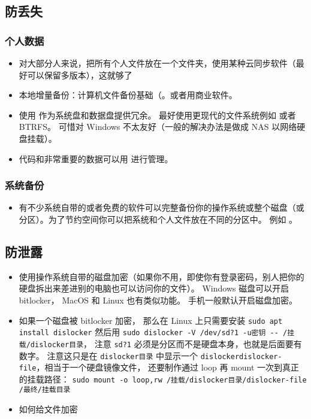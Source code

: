 
\begin{issues}
\issueDraft
\end{issues}

\subsection{防丢失}
\subsubsection{个人数据}
\begin{itemize}
\item 对大部分人来说，把所有个人文件放在一个文件夹，使用某种云同步软件（最好可以保留多版本），这就够了
\item 本地增量备份：计算机文件备份基础（。或者用商业软件。
\item 使用  作为系统盘和数据盘提供冗余。 最好使用更现代的文件系统例如  或者 BTRFS。 可惜对 Windows 不太友好（一般的解决办法是做成 NAS 以网络硬盘挂载）。
\item 代码和非常重要的数据可以用   进行管理。
\end{itemize}

\subsubsection{系统备份}
\begin{itemize}
\item 有不少系统自带的或者免费的软件可以完整备份你的操作系统或整个磁盘（或分区）。为了节约空间你可以把系统和个人文件放在不同的分区中。 例如 。
\end{itemize}

\subsection{防泄露}
\begin{itemize}
\item 使用操作系统自带的磁盘加密（如果你不用，即使你有登录密码，别人把你的硬盘拆出来差进别的电脑也可以访问你的文件）。 Windows 磁盘可以开启 bitlocker， MacOS 和 Linux 也有类似功能。 手机一般默认开启磁盘加密。
\item 如果一个磁盘被 bitlocker 加密， 那么在 Linux 上只需要安装 \verb`sudo apt install dislocker` 然后用 \verb`sudo dislocker -V /dev/sd?1 -u密钥 -- /挂载/dislocker目录`， 注意 \verb`sd?1` 必须是分区而不是硬盘本身，也就是后面要有数字。  注意这只是在 \verb`dislocker目录` 中显示一个 \verb`dislockerdislocker-file`，相当于一个硬盘镜像文件， 还要制作通过 loop 再 mount 一次到真正的挂载路径： \verb`sudo mount -o loop,rw /挂载/dislocker目录/dislocker-file /最终/挂载目录`
\item 如何给文件加密
\end{itemize}
